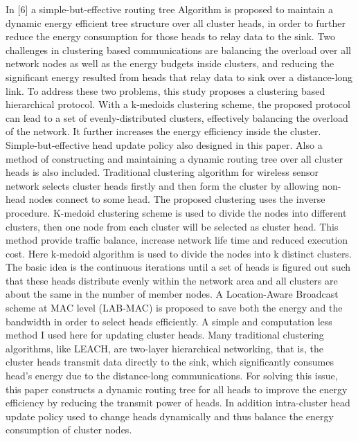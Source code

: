 \documentclass[MTech]{iitmdiss}
\begin{document}
In [6] a simple-but-effective routing tree Algorithm is proposed  to maintain a dynamic energy efficient tree structure over all cluster heads, in order to further reduce the energy consumption for those heads to relay data to the sink. Two challenges in clustering based communications are balancing the overload over all network nodes as well as the energy budgets inside clusters, and reducing the significant energy resulted from heads that relay data
to sink over a distance-long link. To address these two problems, this study proposes a clustering based hierarchical protocol. With a k-medoids clustering scheme, the proposed protocol can lead to a set of evenly-distributed clusters, effectively balancing the overload of the network. It further increases the energy efficiency inside the cluster. Simple-but-effective head update policy also designed in this paper. Also a  method of constructing and maintaining a dynamic routing tree over all cluster heads is also included. Traditional clustering algorithm for wireless sensor network selects cluster heads  firstly and then form the cluster by allowing non-head nodes connect to some head. The proposed clustering uses the inverse procedure. K-medoid clustering  scheme is used to divide the nodes into different clusters, then one node from each cluster will be selected as cluster head. This method provide traffic balance, increase network life time and reduced execution cost. Here k-medoid algorithm is used to divide the nodes into k distinct clusters. The basic idea is the continuous iterations until a set of heads is figured out such that these heads distribute evenly within the network area and all clusters are about the same in the number of member nodes. 
A Location-Aware Broadcast scheme at MAC level (LAB-MAC) is proposed to save both the energy and the bandwidth in order to select heads efficiently. A simple and computation less method I used here for updating cluster heads. Many traditional clustering algorithms, like LEACH,
are two-layer hierarchical networking, that is, the cluster heads transmit data directly to the sink, which significantly consumes head's energy due to the distance-long communications. For solving this  issue, this paper constructs a dynamic routing tree for all heads to improve the energy efficiency by reducing the transmit power of heads. In addition  intra-cluster head update policy used to  change  heads dynamically and thus balance the energy consumption of cluster nodes.
\end{document}
